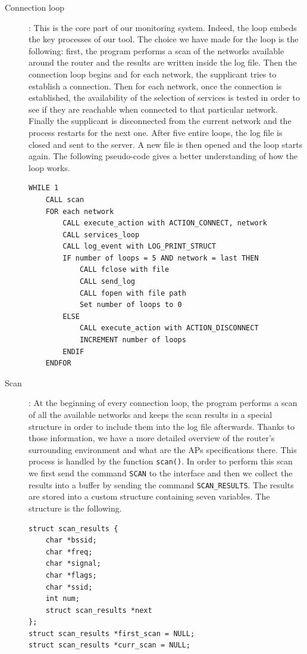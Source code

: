 \begin{description}
	\item[Connection loop]: This is the core part of our monitoring system. Indeed, the loop embeds the key processes of our tool. The choice we have made for the loop is the following: first, the program performs a scan of the networks available around the router and the results are written inside the log file. Then the connection loop begins and for each network, the supplicant tries to establish a connection. Then for each network, once the connection is established, the availability of the selection of services is tested in order to see if they are reachable when connected to that particular network. Finally the supplicant is disconnected from the current network and the process restarts for the next one. After five entire loops, the log file is closed and sent to the server. A new file is then opened and the loop starts again. The following pseudo-code gives a better understanding of how the loop works.\\

\begin{lstlisting}[frame=single,breaklines=true,caption={Connection loop pseudo-code}]
WHILE 1
	CALL scan
	FOR each network
		CALL execute_action with ACTION_CONNECT, network
		CALL services_loop
		CALL log_event with LOG_PRINT_STRUCT
		IF number of loops = 5 AND network = last THEN
			CALL fclose with file
			CALL send_log
			CALL fopen with file path
			Set number of loops to 0
		ELSE
			CALL execute_action with ACTION_DISCONNECT
			INCREMENT number of loops
		ENDIF
	ENDFOR
\end{lstlisting}

	\item[Scan]: At the beginning of every connection loop, the program performs a scan of all the available networks and keeps the scan results in a special structure in order to include them into the log file afterwards. Thanks to those information, we have a more detailed overview of the router's surrounding environment and what are the APs specifications there. This process is handled by the function \texttt{scan()}. In order to perform this scan we first send the command \texttt{SCAN} to the interface and then we collect the results into a buffer by sending the command \texttt{SCAN\_RESULTS}. The results are stored into a custom structure containing seven variables. The structure is the following.\\

\begin{lstlisting}[frame=single,breaklines=true,caption={\texttt{scan\_results} structure}]
struct scan_results {
	char *bssid;
	char *freq;
	char *signal;
	char *flags;
	char *ssid;
	int num;
	struct scan_results *next
};
struct scan_results *first_scan = NULL;
struct scan_results *curr_scan = NULL;
\end{lstlisting}
	

\end{description}
